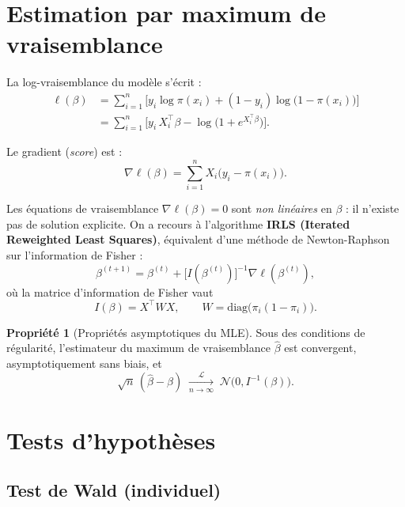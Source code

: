 \documentclass[11pt,a4paper,twoside]{report}
\theoremstyle{definition}
\newtheorem{propriete}{Propriété}[chapter]
\begin{document}
\section{Estimation par maximum de vraisemblance}

La log-vraisemblance du modèle s'écrit :
\begin{align}
  \ell(\beta) &= \sum_{i=1}^n \Big[ y_i \log\pi(x_i) + (1-y_i)\log\big(1-\pi(x_i)\big)\Big] \nonumber \\
  &= \sum_{i=1}^n \Big[ y_i \, X_i^\top\beta - \log\!\big(1+e^{X_i^\top\beta}\big)\Big].
  \label{eq:loglik}
\end{align}

Le gradient (\emph{score}) est :
\begin{equation}
  \nabla\ell(\beta) = \sum_{i=1}^n X_i\big(y_i - \pi(x_i)\big).
\end{equation}

Les équations de vraisemblance $\nabla\ell(\beta) = 0$ sont
\emph{non linéaires} en $\beta$ : il n'existe pas de solution
explicite. On a recours à l'algorithme \textbf{IRLS (Iterated Reweighted
Least Squares)}, équivalent d'une méthode de Newton-Raphson sur
l'information de Fisher :
\begin{equation}
  \beta^{(t+1)} = \beta^{(t)} + \big[I(\beta^{(t)})\big]^{-1} \nabla\ell(\beta^{(t)}),
\end{equation}
où la matrice d'information de Fisher vaut
\begin{equation}
  I(\beta) = X^\top W X, \qquad
  W = \mathrm{diag}\!\big(\pi_i(1-\pi_i)\big).
\end{equation}

\begin{propriete}[Propriétés asymptotiques du MLE]
Sous des conditions de régularité, l'estimateur du maximum de
vraisemblance $\hat\beta$ est convergent, asymptotiquement sans biais,
et
\begin{equation}
  \sqrt{n}\,(\hat\beta - \beta)
  \;\xrightarrow[n\to\infty]{\mathcal{L}}\;
  \mathcal{N}\!\big(0, I^{-1}(\beta)\big).
\end{equation}
\end{propriete}

\section{Tests d'hypothèses}

\subsection{Test de Wald (individuel)}
\end{document}

